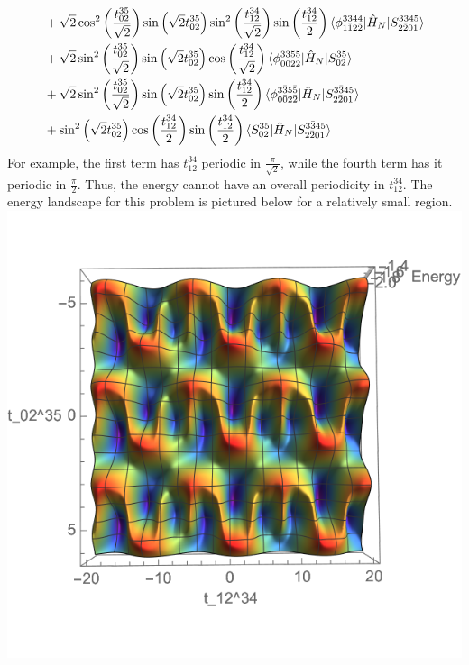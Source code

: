 \documentclass{article}
\begin{document}
\begin{align}
&+\sqrt{2}\cos^2\left(\frac{t_{02}^{35}}{\sqrt{2}}\right)\sin\left(\sqrt{2}t_{02}^{35}\right)\sin^2\left(\frac{t_{12}^{34}}{\sqrt{2}}\right)\sin\left(\frac{t_{12}^{34}}{2}\right)\braket{\phi_{1\bar{1}2\bar{2}}^{3\bar{3}4\bar{4}}|\hat{H}_N|S_{2\bar{2}01}^{3\bar{3}45}}\\
&+\sqrt{2}\sin^2\left(\frac{t_{02}^{35}}{\sqrt{2}}\right)\sin\left(\sqrt{2}t_{02}^{35}\right)\cos\left(\frac{t_{12}^{34}}{\sqrt{2}}\right)\braket{\phi_{0\bar{0}2\bar{2}}^{3\bar{3}5\bar{5}}|\hat{H}_N|S_{02}^{35}}\\
&+\sqrt{2}\sin^2\left(\frac{t_{02}^{35}}{\sqrt{2}}\right)\sin\left(\sqrt{2}t_{02}^{35}\right)\sin\left(\frac{t_{12}^{34}}{2}\right)\braket{\phi_{0\bar{0}2\bar{2}}^{3\bar{3}5\bar{5}}|\hat{H}_N|S_{2\bar{2}01}^{3\bar{3}45}}\\
&+\sin^2\left(\sqrt{2}t_{02}^{35}\right)\cos\left(\frac{t_{12}^{34}}{2}\right)\sin\left(\frac{t_{12}^{34}}{2}\right)\braket{S_{02}^{35}|\hat{H}_N|S_{2\bar{2}01}^{3\bar{3}45}}
\end{align}
For example, the first term has $t_{12}^{34}$ periodic in $\frac{\pi}{\sqrt{2}}$, while the fourth term has it periodic in $\frac{\pi}{2}$.  Thus, the energy cannot have an overall periodicity in $t_{12}^{34}$.  The energy landscape for this problem is pictured below for a relatively small region.\\
\includegraphics{non-periodic.pdf}\\
\end{document}
